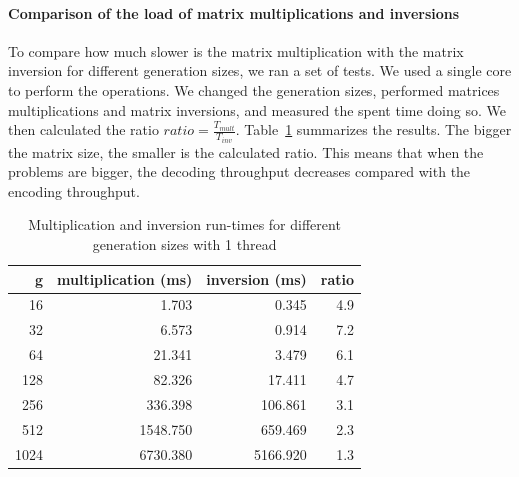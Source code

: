 %
%



\paragraph{Comparison of the load of matrix multiplications and inversions}

To compare how much slower is the matrix multiplication with the matrix
inversion for different generation sizes, we ran a set of tests. We used a
single core to perform the operations. We changed the generation sizes,
performed matrices multiplications and matrix inversions, and measured the spent
time doing so. We then calculated the ratio $ratio = \frac{T_{mult}}{T_{inv}}$.
Table~\ref{runtimes} summarizes the results. The bigger the matrix size, the
smaller is the calculated ratio. This means that when the problems are bigger,
the decoding throughput decreases compared with the encoding throughput.

\begin{table}[H]
\center
\caption{Multiplication and inversion run-times for different generation sizes with 1 thread}
\begin{tabular}{|r|r|r|r|}
\hline
g & multiplication (ms) & inversion (ms) & ratio \\
\hline
\hline

	16 & 1.703  & 0.345 & 4.9 \\
\hline
	32 & 6.573  & 0.914 & 7.2 \\
\hline
	64 & 21.341  & 3.479 & 6.1 \\
\hline
	128 & 82.326  & 17.411 & 4.7 \\
\hline
	256 & 336.398  & 106.861 & 3.1 \\
\hline
	512 & 1548.750  & 659.469 & 2.3 \\
\hline
	1024 & 6730.380  & 5166.920 & 1.3 \\
\hline
\end{tabular}
\vspace{0.2cm}
\label{runtimes}
\end{table}
